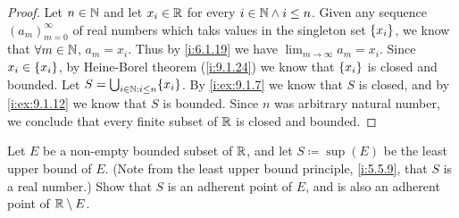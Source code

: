 \begin{proof}
  Let \(n \in \mathbb{N}\) and let \(x_i \in \mathbb{R}\) for every \(i \in \mathbb{N} \land i \leq n\).
  Given any sequence \((a_m)_{m = 0}^\infty\) of real numbers which taks values in the singleton set \(\left\lbrace x_i\right\rbrace\), we know that \(\forall m \in \mathbb{N}\), \(a_m = x_i\).
  Thus by \cref{i:6.1.19} we have \(\lim_{m \to \infty} a_m = x_i\).
  Since \(x_i \in \left\lbrace x_i\right\rbrace\), by Heine-Borel theorem (\cref{i:9.1.24}) we know that \(\left\lbrace x_i\right\rbrace\) is closed and bounded.
  Let \(S = \bigcup_{i \in \N : i \leq n} \set{x_i}\).
  By \cref{i:ex:9.1.7} we know that \(S\) is closed, and by \cref{i:ex:9.1.12} we know that \(S\) is bounded.
  Since \(n\) was arbitrary natural number, we conclude that every finite subset of \(\mathbb{R}\) is closed and bounded.
\end{proof}

\begin{ex}\label{i:ex:9.1.15}
  Let \(E\) be a non-empty bounded subset of \(\mathbb{R}\), and let \(S \coloneqq \sup(E)\) be the least upper bound of \(E\).
  (Note from the least upper bound principle, \cref{i:5.5.9}, that \(S\) is a real number.)
  Show that \(S\) is an adherent point of \(E\), and is also an adherent point of \(\mathbb{R} \setminus E\).
\end{ex}

